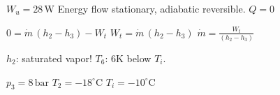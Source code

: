 \( W_u = 28 \, \text{W} \)  
Energy flow stationary, adiabatic reversible.  
\( Q = 0 \)  

\( 0 = \dot{m} \, (h_2 - h_3) - W_t \)  
\( W_t = \dot{m} \, (h_2 - h_3) \)  
\( \dot{m} = \frac{W_t}{(h_2 - h_3)} \)  

\( h_2 \): saturated vapor!  
\( T_6 \): 6K below \( T_i \).  

\( p_3 = 8 \, \text{bar} \)  
\( T_2 = -18^\circ \text{C} \)  
\( T_i = -10^\circ \text{C} \)